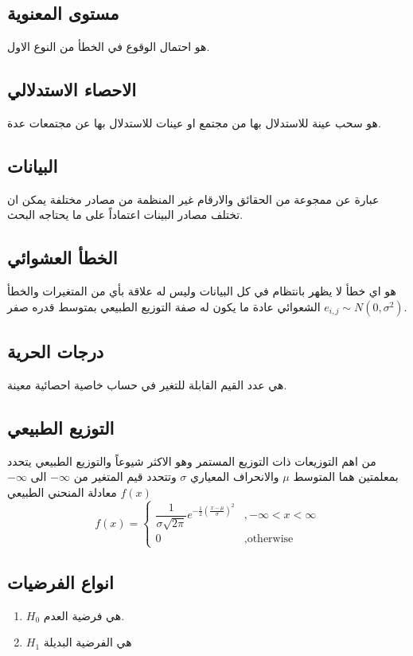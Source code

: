 \subsection{مستوى المعنوية}
هو احتمال الوقوع في الخطأ من النوع الاول.

\subsection{الاحصاء الاستدلالي}
هو سحب عينة للاستدلال بها من مجتمع او عينات للاستدلال بها عن مجتمعات عدة.

\subsection{البيانات}
عبارة عن ممجوعة من الحقائق والارقام غير المنظمة من مصادر مختلفة يمكن ان تختلف مصادر البينات اعتماداً على ما يحتاجه البحث.

\subsection{الخطأ العشوائي }
هو اي خطأ لا يظهر بانتظام في كل البيانات وليس له علاقة بأي من المتغيرات والخطأ الشعوائي عادة ما يكون له صفة التوزيع الطبيعي بمتوسط قدره صفر $e_{i,j} \sim N(0, \sigma^2)$.

\subsection{درجات الحرية}
هي عدد القيم القابلة للتغير في حساب خاصية احصائية معينة.

\subsection{التوزيع الطبيعي}
من اهم التوزيعات ذات التوزيع المستمر وهو الاكثر شيوعاً والتوزيع الطبيعي يتحدد بمعلمتين هما المتوسط $\mu$ والانحراف المعياري $\sigma$ وتتحدد قيم  المتغير من $-\infty$ الى $-\infty$ معادلة المنحني الطبيعي $f(x)$ 
\[
f(x) = 
\begin{cases}
	\dfrac{1}{\sigma\sqrt{2\pi}} e^{-\frac{1}{2}\left(\frac{x-\mu}{\sigma}\right)^2} & ,-\infty < x < \infty \\[5pt]
	0 & , \text{otherwise}
\end{cases}
\]

\subsection{انواع الفرضيات}

\begin{enumerate}
	\item $H_0$ هي فرضية العدم.
	\item $H_1$ هي الفرضية البديلة
\end{enumerate}

